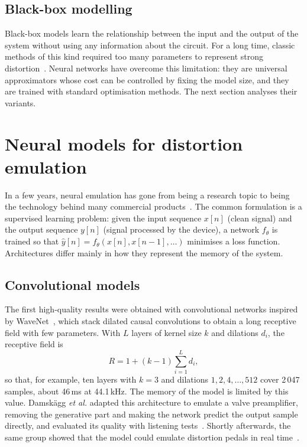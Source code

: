 \documentclass[ENG]{TFUOC}%
\begin{document}
\subsection{Black-box modelling}

Black-box models learn the relationship between the input and the output of the system without using any information about the circuit. For a long time, classic methods of this kind required too many parameters to represent strong distortion~\cite{pakarinen2009,schmitz2018}. Neural networks have overcome this limitation: they are universal approximators whose cost can be controlled by fixing the model size, and they are trained with standard optimisation methods. The next section analyses their variants.

\section{Neural models for distortion emulation}
\label{s:neural}

In a few years, neural emulation has gone from being a research topic to being the technology behind many commercial products~\cite{vanhatalo2022}. The common formulation is a supervised learning problem: given the input sequence $x[n]$ (clean signal) and the output sequence $y[n]$ (signal processed by the device), a network $f_\theta$ is trained so that $\hat{y}[n]=f_\theta(x[n], x[n-1], \dots)$ minimises a loss function. Architectures differ mainly in how they represent the memory of the system.

\subsection{Convolutional models}

The first high-quality results were obtained with convolutional networks inspired by WaveNet~\cite{vandenoord2016}, which stack dilated causal convolutions to obtain a long receptive field with few parameters. With $L$ layers of kernel size $k$ and dilations $d_i$, the receptive field is
\begin{equation}
R = 1 + (k-1)\sum_{i=1}^{L} d_i ,
\end{equation}
so that, for example, ten layers with $k=3$ and dilations $1, 2, 4, \dots, 512$ cover 2\,047 samples, about 46\,ms at 44.1\,kHz. The memory of the model is limited by this value. Damskägg \emph{et al.} adapted this architecture to emulate a valve preamplifier, removing the generative part and making the network predict the output sample directly, and evaluated its quality with listening tests~\cite{damskagg2019}. Shortly afterwards, the same group showed that the model could emulate distortion pedals in real time~\cite{damskagg2019smc}.
\end{document}
